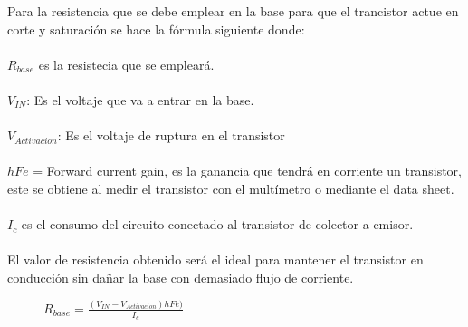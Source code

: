 \documentclass[letterpaper]{article}
\begin{document}
\begin{large}
    Para la resistencia que se debe emplear en la base para que el trancistor actue en corte y saturación se hace la fórmula siguiente donde:\\\\
    $R_{base}$ es la resistecia que se empleará.\\\\
    $V_{IN}$: Es el voltaje que va a entrar en la base.\\\\
    $V_{Activacion}$: Es el voltaje de ruptura en el transistor\\\\
    $hFe$ = Forward current gain, es la ganancia que tendrá en corriente un transistor, este se obtiene al medir el transistor con el multímetro o mediante el data sheet.\\\\
    $I_{c}$ es el consumo del circuito conectado al transistor de colector a emisor.\\\\
    El valor de resistencia obtenido será el ideal para mantener el transistor en conducción sin dañar la base con demasiado flujo de corriente. 
    \vspace{.3cm}
    
    \begin{figure}[htbp]
    \begin{huge}
    $R_{base}=\frac{(V_{IN}-V_{Activacion})hFe)}{I_{c}}$
    \end{huge}
    \end{figure}
    

\end{large}
\end{document}
